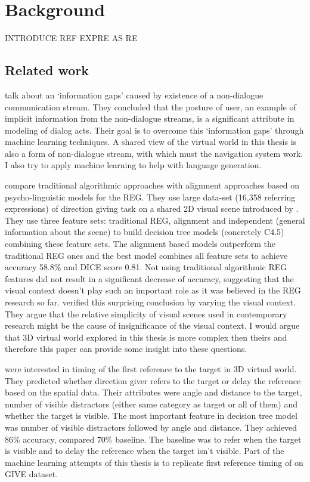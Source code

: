 \chapter{Background}
\label{chap:bg}

INTRODUCE REF EXPRE AS RE

\section{Related work}
\citet{ha2012combining} talk about an `information gaps' caused by existence of a non-dialogue communication stream. They concluded that the posture of user, an example of implicit information from the non-dialogue streams, is a significant attribute in modeling of dialog acts. Their goal is to overcome this `information gaps' through machine learning techniques. A shared view of the virtual world in this thesis is also a form of non-dialogue stream, with which must the navigation system work. I also try to apply machine learning to help with language generation.

\citet{viethen2011generating} compare traditional algorithmic approaches with alignment approaches based on psycho-linguistic models for the REG. They use large data-set (16,358 referring expressions) of direction giving task on a shared 2D visual scene introduced by \citet{louwerse2007multimodal}. They use three feature sets: traditional REG, alignment and independent (general information about the scene) to build decision tree models (concretely C4.5) combining these feature sets. The alignment based models outperform the traditional REG ones and the best model combines all feature sets to achieve accuracy 58.8\% and DICE score 0.81. Not using traditional algorithmic REG features did not result in a significant decrease of accuracy, suggesting that the visual context doesn't play such an important role as it was believed in the REG research so far.  \citet{viethen2011impact} verified this surprising conclusion by varying the visual context. They argue that the relative simplicity of visual scenes used in contemporary research might be the cause of insignificance of the visual context. I would argue that 3D  virtual world explored in this thesis is more complex then theirs and therefore this paper can provide some insight into these questions.  

\citet{stoia2006sentence} were interested in timing of the first reference to the target in 3D virtual world. They predicted whether direction giver refers to the target or delay the reference based on the spatial data. Their attributes were angle and distance to the target, number of visible distractors (either same category as target or all of them) and whether the target is visible. The most important feature in decision tree model was number of visible distractors followed by angle and distance. They achieved 86\% accuracy, compared 70\% baseline. The baseline was to refer when the target is visible and to delay the reference when the target isn't visible. Part of the machine learning attempts of this thesis is to replicate first reference timing of \citet{stoia2006sentence} on GIVE dataset.

